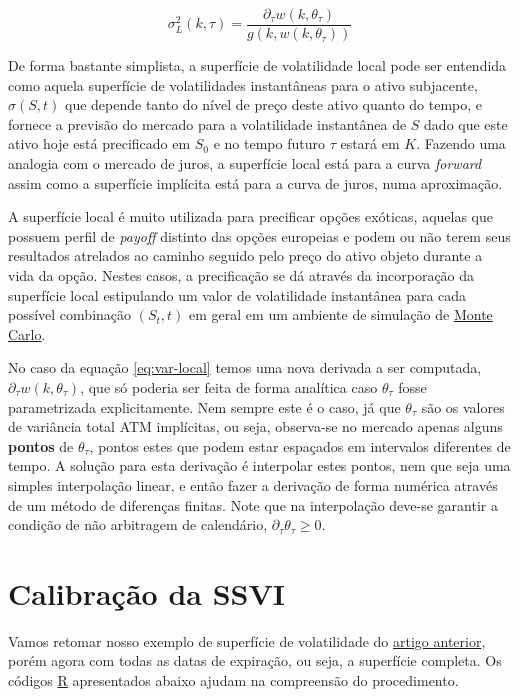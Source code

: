 \documentclass[]{book}
\theoremstyle{definition}
\theoremstyle{definition}
\theoremstyle{definition}
\theoremstyle{remark}
\begin{document}
\begin{equation}
\sigma^2_L(k, \tau)=\frac{\partial_\tau w(k, \theta_\tau)}{g(k, w(k, \theta_\tau))}
\label{eq:var-local}
\end{equation}

De forma bastante simplista, a superfície de volatilidade local pode ser entendida como aquela superfície de volatilidades instantâneas para o ativo subjacente, \(\sigma(S, t)\) que depende tanto do nível de preço deste ativo quanto do tempo, e fornece a previsão do mercado para a volatilidade instantânea de \(S\) dado que este ativo hoje está precificado em \(S_0\) e no tempo futuro \(\tau\) estará em \(K\). Fazendo uma analogia com o mercado de juros, a superfície local está para a curva \emph{forward} assim como a superfície implícita está para a curva de juros, numa aproximação.

A superfície local é muito utilizada para precificar opções exóticas, aquelas que possuem perfil de \emph{payoff} distinto das opções europeias e podem ou não terem seus resultados atrelados ao caminho seguido pelo preço do ativo objeto durante a vida da opção. Nestes casos, a precificação se dá através da incorporação da superfície local estipulando um valor de volatilidade instantânea para cada possível combinação \((S_t, t)\) em geral em um ambiente de simulação de \protect\hyperlink{monte-carlo}{Monte Carlo}.

No caso da equação \eqref{eq:var-local} temos uma nova derivada a ser computada, \(\partial_\tau w(k, \theta_\tau)\), que só poderia ser feita de forma analítica caso \(\theta_\tau\) fosse parametrizada explicitamente. Nem sempre este é o caso, já que \(\theta_\tau\) são os valores de variância total ATM implícitas, ou seja, observa-se no mercado apenas alguns \textbf{pontos} de \(\theta_\tau\), pontos estes que podem estar espaçados em intervalos diferentes de tempo. A solução para esta derivação é interpolar estes pontos, nem que seja uma simples interpolação linear, e então fazer a derivação de forma numérica através de um método de diferenças finitas. Note que na interpolação deve-se garantir a condição de não arbitragem de calendário, \(\partial_\tau\theta_\tau\geq 0\).

\hypertarget{calibracao-da-ssvi}{%
\section{Calibração da SSVI}\label{calibracao-da-ssvi}}

Vamos retomar nosso exemplo de superfície de volatilidade do \protect\hyperlink{svi}{artigo anterior}, porém agora com todas as datas de expiração, ou seja, a superfície completa. Os códigos \href{https://cran.r-project.org/}{R} apresentados abaixo ajudam na compreensão do procedimento.
\end{document}
